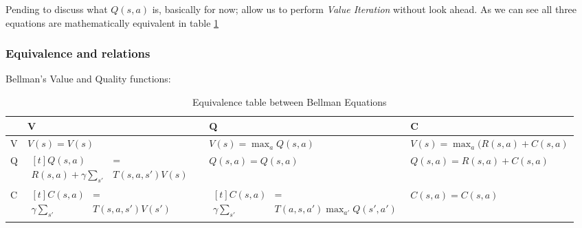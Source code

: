 \documentclass[paper=a4,fontsize=11pt]{scrartcl} %
\numberwithin{equation}{section} %
\numberwithin{figure}{section} %
\numberwithin{table}{section} %
\begin{document}
Pending to discuss what $Q(s,a)$ is, basically for now; allow us to
perform \textit{Value Iteration} without look ahead. As we can see all 
three equations are mathematically equivalent in table 
\ref{tab:Bellman_equiv}


\subsubsection{Equivalence and relations}

Bellman's Value and Quality functions:

\begin{table}[h]
  	\begin{center}
      \caption{Equivalence table between Bellman Equations}
      \label{tab:Bellman_equiv}
      \begin{tabular}{| >{\centering\arraybackslash}m{0.15in} | 
      					>{\centering\arraybackslash}m{1.9in} | 
                        >{\centering\arraybackslash}m{1.9in} | 
                        >{\centering\arraybackslash}m{1.5in} |}
      \hline
        & \textbf{V} & \textbf{Q} & \textbf{C} \\ \hline
      \hline
          V &  
          $V(s)=V(s)$  &  
          $V(s)=\max_a Q(s,a)$  &  
          $V(s)=\max_a(R(s,a) + C(s,a)$ \\ 
      \hline
          Q &  
          $\begin{aligned}[t]
              Q(s,a)&=\\R(s,a)+\gamma\sum_{s'}&T(s,a,s')V(s) &
          \end{aligned}$ & 
          $Q(s,a)=Q(s,a)$ &
          $ Q(s,a)=R(s,a)+C(s,a) $ \\
      \hline
          C &
          $\begin{aligned}[t]
              C(s,a)&=\\\gamma\sum_{s'}&T(s,a,s')V(s')
          \end{aligned}$ &
          $\begin{aligned}[t]
              C(s,a)&=\\\gamma\sum_{s'}&T(a,s,a')\max_{a'}Q(s',a')
          \end{aligned}$ &
          $C(s,a)=C(s,a)$ \\ 
      \hline
      \end{tabular}
    \end{center}
\end{table}


\end{document}
